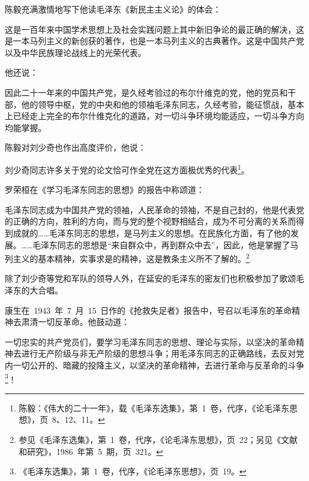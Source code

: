 陈毅充满激情地写下他读毛泽东《新民主主义论》的体会：

\begin{quoting}
这是一百年来中国学术思想上及社会实践问题上其中新旧争论的最正确的解决，这是一本马列主义的新创获的著作，也是一本马列主义的古典著作。这是中国共产党以及中华民族理论战线上的光荣代表。
\end{quoting}

他还说：

\begin{quoting}

因此二十一年来的中国共产党，是久经考验过的布尔什维克的党，他的党员和干部，他的领导中枢，党的中央和他的领袖毛泽东同志，久经考验，能征惯战，基本上已经走上完全的布尔什维克化的道路，对一切斗争环境均能适应，一切斗争方向均能掌握。
\end{quoting}

陈毅对刘少奇也作出高度评价，他说：

\begin{quoting}
刘少奇同志许多关于党的论文恰可作全党在这方面极优秀的代表\footnote{陈毅：《伟大的二十一年》，载《毛泽东选集》，第~1~卷，代序，《论毛泽东思想》，页~8、12、11。}。
\end{quoting}

罗荣桓在《学习毛泽东同志的思想》的报告中称颂道：

\begin{quoting}
毛泽东同志成为中国共产党的领袖，人民革命的领袖，不是自己封的，他是代表党的正确的方向，胜利的方向，而与党的整个视野相结合，成为不可分离的关系而得到成就的……毛泽东同志的思想，是马列主义的思想。在民族化方面，有了他的发展。……毛泽东同志的思想是“来自群众中，再到群众中去”，因此，他是掌握了马列主义的基本精神，实事求是的精神，这是教条主义所不了解的。\footnote{参见《毛泽东选集》，第~1~卷，代序，《论毛泽东思想》，页~22；另见《文献和研究》，1986~年第~5~期，页~321。}
\end{quoting}

除了刘少奇等党和军队的领导人外，在延安的毛泽东的密友们也积极参加了歌颂毛泽东的大合唱。

康生在~1943~年~7~月~15~日作的《抢救失足者》报告中，号召以毛泽东的革命精神去肃清一切反革命。他鼓动道：

\begin{quoting}
一切忠实的共产党员们，要学习毛泽东同志的思想、理论与实际，以坚决的革命精神去进行无产阶级与非无产阶级的思想斗争；用毛泽东同志的正确路线，去反对党内一切公开的、暗藏的投降主义，以坚决的革命精神，去进行革命与反革命的斗争\footnote{《毛泽东选集》，第~1~卷，代序，《论毛泽东思想》，页~19。}！
\end{quoting}

